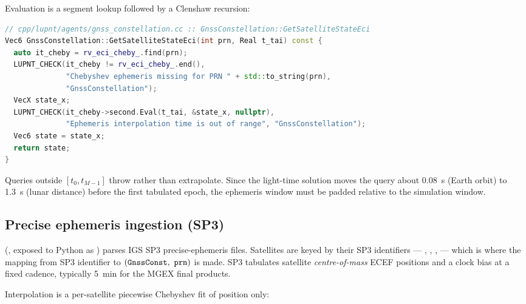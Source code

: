 Evaluation is a segment lookup followed by a Clenshaw recursion:

\begin{lstlisting}[language=cpp, caption={Ephemeris evaluation at an arbitrary
epoch.}, label={lst:gnss-cheby-eval}]
// cpp/lupnt/agents/gnss_constellation.cc :: GnssConstellation::GetSatelliteStateEci
Vec6 GnssConstellation::GetSatelliteStateEci(int prn, Real t_tai) const {
  auto it_cheby = rv_eci_cheby_.find(prn);
  LUPNT_CHECK(it_cheby != rv_eci_cheby_.end(),
              "Chebyshev ephemeris missing for PRN " + std::to_string(prn),
              "GnssConstellation");
  VecX state_x;
  LUPNT_CHECK(it_cheby->second.Eval(t_tai, &state_x, nullptr),
              "Ephemeris interpolation time is out of range", "GnssConstellation");
  Vec6 state = state_x;
  return state;
}
\end{lstlisting}

Queries outside $[t_0, t_{M-1}]$ throw rather than extrapolate. Since the
light-time solution moves the query about \SI{0.08}{\second} (Earth orbit) to
\SI{1.3}{\second} (lunar distance) before the first tabulated epoch, the
ephemeris window must be padded relative to the simulation window.

\subsection{Precise ephemeris ingestion (SP3)}
\label{sec:gnss-sp3}

 (, exposed to Python
as ) parses IGS SP3 precise-ephemeris files. Satellites are
keyed by their SP3 identifiers --- , , ,
 --- which is where the mapping from SP3 identifier to
$(\texttt{GnssConst},\ \texttt{prn})$ is made. SP3 tabulates satellite
\emph{centre-of-mass} ECEF positions and a clock bias at a fixed cadence,
typically \SI{5}{\minute} for the MGEX final products.

Interpolation is a per-satellite piecewise Chebyshev fit of position only:

